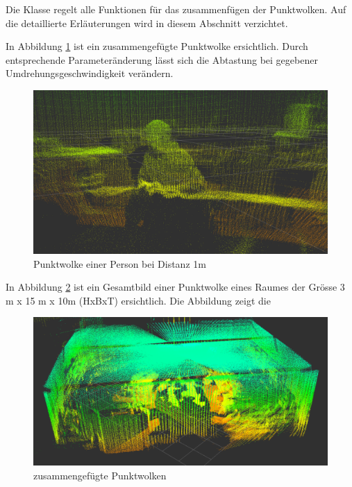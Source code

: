 Die Klasse regelt alle Funktionen für das zusammenfügen der Punktwolken. Auf die detaillierte Erläuterungen wird in diesem Abschnitt verzichtet. 



In Abbildung \ref{fig:pointcloud_test} ist ein zusammengefügte Punktwolke ersichtlich. Durch entsprechende Parameteränderung lässt sich die Abtastung bei gegebener Umdrehungsgeschwindigkeit verändern.
 
\begin{figure}[H]
\centering
\includegraphics[width=1.0\textwidth]{resources/pointcloud_test.png}
\caption[Punktwolke einer Person bei Distanz 1m]{Punktwolke einer Person bei Distanz 1m}
\label{fig:pointcloud_test}
\end{figure}



In Abbildung \ref{fig:raumausmessung} ist ein Gesamtbild einer Punktwolke eines Raumes der Grösse 3 m x 15 m x 10m (HxBxT) ersichtlich. Die Abbildung zeigt die 

\begin{figure}[H]
	\centering
	\includegraphics[width=1.0\textwidth]{resources/raumausmessung.png}
	\caption[zusammengefügte Punktwolken]{zusammengefügte Punktwolken}
	\label{fig:raumausmessung}
\end{figure}  




